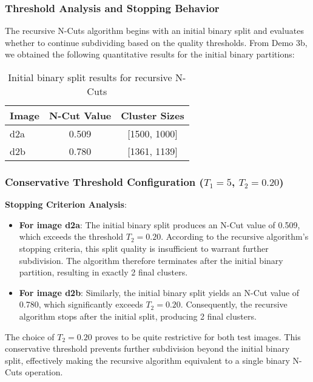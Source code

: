 \documentclass[12pt,a4paper]{article}
\begin{document}
{\subsubsection{Threshold Analysis and Stopping Behavior}

The recursive N-Cuts algorithm begins with an initial binary split and evaluates whether to continue subdividing based on the quality thresholds. From Demo 3b, we obtained the following quantitative results for the initial binary partitions:

\begin{table}[H]
\centering
\begin{tabular}{@{}lcc@{}}
\toprule
Image & N-Cut Value & Cluster Sizes \\
\midrule
d2a & 0.509 & [1500, 1000] \\
d2b & 0.780 & [1361, 1139] \\
\bottomrule
\end{tabular}
\caption{Initial binary split results for recursive N-Cuts}
\label{tab:demo3c_initial}
\end{table}

\subsubsection{Conservative Threshold Configuration ($T_1=5$, $T_2=0.20$)}

\textbf{Stopping Criterion Analysis}:
\begin{itemize}
    \item \textbf{For image d2a}: The initial binary split produces an N-Cut value of 0.509, which exceeds the threshold $T_2 = 0.20$. According to the recursive algorithm's stopping criteria, this split quality is insufficient to warrant further subdivision. The algorithm therefore terminates after the initial binary partition, resulting in exactly 2 final clusters.
    
    \item \textbf{For image d2b}: Similarly, the initial binary split yields an N-Cut value of 0.780, which significantly exceeds $T_2 = 0.20$. Consequently, the recursive algorithm stops after the initial split, producing 2 final clusters.
\end{itemize}

The choice of $T_2=0.20$ proves to be quite restrictive for both test images. This conservative threshold prevents further subdivision beyond the initial binary split, effectively making the recursive algorithm equivalent to a single binary N-Cuts operation.

}
\end{document}
